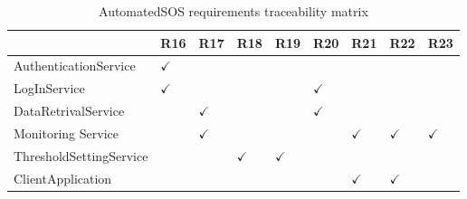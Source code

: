 \begin{table}
\begin{adjustwidth}{-4cm}{}
\captionsetup{justification=centering}
\caption{AutomatedSOS requirements traceability matrix}
  \label{tab:table2}
\begin{tabular}{|l||l|l|l|l|l|l|l|l|}
\hline
\cellcolor[HTML]{EFEFEF}                      & \cellcolor[HTML]{EFEFEF} R16 & \cellcolor[HTML]{EFEFEF} R17 & \cellcolor[HTML]{EFEFEF} R18 & \cellcolor[HTML]{EFEFEF} R19 & \cellcolor[HTML]{EFEFEF} R20 & \cellcolor[HTML]{EFEFEF} R21 & \cellcolor[HTML]{EFEFEF} R22 & \cellcolor[HTML]{EFEFEF} R23 \\ \hline \hline
\cellcolor[HTML]{EFEFEF}AuthenticationService & $\checkmark$  &    &    &   &   &   &    &    \\ \hline
\cellcolor[HTML]{EFEFEF}LogInService     &  $\checkmark$  &       &   &    & $\checkmark$   &    &    &    \\ \hline
\cellcolor[HTML]{EFEFEF}DataRetrivalService         &    & $\checkmark$     &    &   &  $\checkmark$  &    &    &   \\ \hline
\cellcolor[HTML]{EFEFEF} Monitoring Service    &    &   $\checkmark$ &      &    &    &  $\checkmark$  & $\checkmark$  &  $\checkmark$  \\ \hline
\cellcolor[HTML]{EFEFEF} ThresholdSettingService  &    &       &  $\checkmark$  &  $\checkmark$  &    &    &    &    \\ \hline
\cellcolor[HTML]{EFEFEF} ClientApplication  &    &    &       &    &    &  $\checkmark$  &  $\checkmark$  &     \\ \hline
\end{tabular}
\end{adjustwidth}
\end{table}

